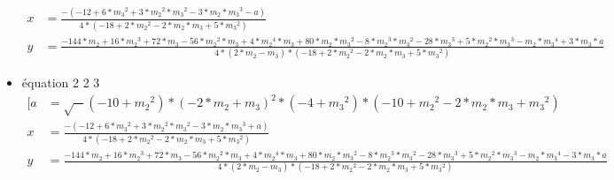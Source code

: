 \documentclass[a4paper, 8pt]{article}
\begin{document}
\begin{itemize}[label=$\bullet$]
{\begin{equation}
\begin{split}
   x  & =  \frac{-(-12+6*{{m}_{3}}^{2}+3*{{m}_{2}}^{2}*{{m}_{3}}^{2}-3*{m}_{2}*{{m}_{3}}^{3}-a)}{4*(-18+2*{{m}_{2}}^{2}-2*{m}_{2}*{m}_{3}+5*{{m}_{3}}^{2})} \\
   	 y &  = \frac{-144*{m}_{2}+16*{{m}_{2}}^{3}+72*{m}_{3}-56*{{m}_{2}}^{2}*{m}_{3}+4*{{m}_{2}}^{4}*{m}_{3}+80*{m}_{2}*{{m}_{3}}^{2}-8*{{m}_{2}}^{3}*{{m}_{3}}^{2}-28*{{m}_{3}}^{3}+5*{{m}_{2}}^{2}*{{m}_{3}}^{3}-{m}_{2}*{{m}_{3}}^{4}+3*{m}_{3}*a}{4*(2*{m}_{2}-{m}_{3})*(-18+2*{{m}_{2}}^{2}-2*{m}_{2}*{m}_{3}+5*{{m}_{3}}^{2})}
   	\end{split}
 \end{equation}
}
\item équation 2 2 3
{\tiny
\begin{equation} \label{6}
   	\begin{split}
   [a & = \sqrt-(-10+{{m}_{2}}^{2})*{(-2*{m}_{2}+{m}_{3})}^{2}*(-4+{{m}_{3}}^{2})*(-10+{{m}_{2}}^{2}-2*{m}_{2}*{m}_{3}+{{m}_{3}}^{2})\\
  x & = \frac{-(-12+6*{{m}_{3}}^{2}+3*{{m}_{2}}^{2}*{{m}_{3}}^{2}-3*{m}_{2}*{{m}_{3}}^{3}+a)}{4*(-18+2*{{m}_{2}}^{2} -2*{m}_{2}*{m}_{3}+5*{{m}_{3}}^{2})} \\
   	 y & = \frac{-144*{m}_{2}+16*{{m}_{2}}^{3}+72*{m}_{3}-56*{{m}_{2}}^{2}*{m}_{3}+4*{{m}_{2}}^{4}*{m}_{3}+80*{m}_{2}*{{m}_{3}}^{2}-8*{{m}_{2}}^{3}*{{m}_{3}}^{2}-28*{{m}_{3}}^{3}+5*{{m}_{2}}^{2}*{{m}_{3}}^{3}-{m}_{2}*{{m}_{3}}^{4}-3*{m}_{3}*a}{4*(2*{m}_{2}-{m}_{3})*(-18+2*{{m}_{2}}^{2}-2*{m}_{2}*{m}_{3}+5*{{m}_{3}}^{2})}
   	\end{split}
\end{equation}
}


\end{itemize}
\end{document}
